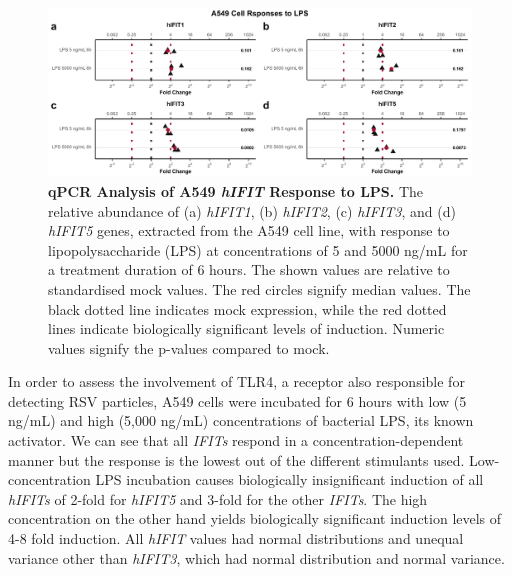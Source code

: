 \begin{figure}
    \centering
    \includegraphics[width=1\linewidth]{06. Chapter 1/Figs/01. Induction/03. a549_treat_lps.pdf}
    \caption[qPCR Analysis of A549 \textit{hIFIT} Response to LPS.]{\textbf{qPCR Analysis of A549 \textit{hIFIT} Response to LPS.} The relative abundance of (a) \textit{hIFIT1}, (b) \textit{hIFIT2}, (c) \textit{hIFIT3}, and (d) \textit{hIFIT5} genes, extracted from the A549 cell line, with response to lipopolysaccharide (LPS) at concentrations of 5 and 5000 ng/mL for a treatment duration of 6 hours. The shown values are relative to standardised mock values. The red circles signify median values. The black dotted line indicates mock expression, while the red dotted lines indicate biologically significant levels of induction. Numeric values signify the p-values compared to mock.}
    \label{fig:A549 Response to LPS}
\end{figure}

In order to assess the involvement of TLR4, a receptor also responsible for detecting RSV particles, A549 cells were incubated for 6 hours with low (5 ng/mL) and high (5,000 ng/mL) concentrations of bacterial LPS, its known activator. We can see that all \textit{IFITs} respond in a concentration-dependent manner but the response is the lowest out of the different stimulants used. Low-concentration LPS incubation causes biologically insignificant induction of all \textit{hIFITs} of 2-fold for \textit{hIFIT5} and 3-fold for the other \textit{IFITs}. The high concentration on the other hand yields biologically significant induction levels of 4-8 fold induction. All \textit{hIFIT} values had normal distributions and unequal variance other than \textit{hIFIT3}, which had normal distribution and normal variance.

